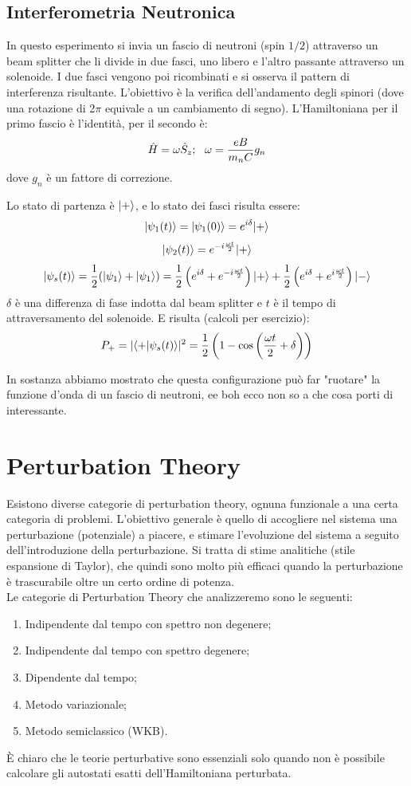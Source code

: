 \subsection{Interferometria Neutronica}
In questo esperimento si invia un fascio di neutroni (spin $1/2$) attraverso un beam splitter che li divide in due fasci, uno libero e l'altro passante attraverso un solenoide. I due fasci vengono poi ricombinati e si osserva il pattern di interferenza risultante. L'obiettivo è la verifica dell'andamento degli spinori (dove una rotazione di 2$\pi$ equivale a un cambiamento di segno). L'Hamiltoniana per il primo fascio è l'identità, per il secondo è:
\[
\H = \omega \SG z;\ \ \omega = \frac{eB}{m_n C}g_n
\]
dove $g_n$ è un fattore di correzione.

Lo stato di partenza è $\Ket +$, e lo stato dei fasci risulta essere:
\[
\Ket {\psi_1(t)} = \Ket {\psi_1(0)} = e^{i\delta}\Ket +\]\[
\Ket {\psi_2(t)} = e^{-i \frac{\omega t}{2}} \Ket + \]\[
\Ket {\psi_s(t)} = \half (\Ket {\psi_1} + \Ket {\psi_1}) = \half \left( e^{i\delta} + e^{-i \frac{\omega t}{2}} \right) \Ket + + \half \left( e^{i\delta} + e^{i \frac{\omega t}{2}} \right) \Ket -
\]
$\delta$ è una differenza di fase indotta dal beam splitter e $t$ è il tempo di attraversamento del solenoide. E risulta (calcoli per esercizio):
\[
	P_+ = |\braket{+}{\psi_s(t)}|^2 = \half\left(1 - \cos\left( \frac{\omega t}{2} + \delta \right)\right)
\]

In sostanza abbiamo mostrato che questa configurazione può far "ruotare" la funzione d'onda di un fascio di neutroni, ee boh ecco non so a che cosa porti di interessante.
	
\newpage

\section{Perturbation Theory}
Esistono diverse categorie di perturbation theory, ognuna funzionale a una certa categoria di problemi. L'obiettivo generale è quello di accogliere nel sistema una perturbazione (potenziale) a piacere, e stimare l'evoluzione del sistema a seguito dell'introduzione della perturbazione. Si tratta di stime analitiche (stile espansione di Taylor), che quindi sono molto più efficaci quando la perturbazione è trascurabile oltre un certo ordine di potenza.\\
Le categorie di Perturbation Theory che analizzeremo sono le seguenti:

\begin{enumerate}
	\item Indipendente dal tempo con spettro non degenere;
	\item Indipendente dal tempo con spettro degenere;
	\item Dipendente dal tempo;
	\item Metodo variazionale;
	\item Metodo semiclassico (WKB).
\end{enumerate}
È chiaro che le teorie perturbative sono essenziali solo quando non è possibile calcolare gli autostati esatti dell'Hamiltoniana perturbata.

